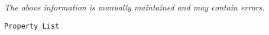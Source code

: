 \label{pkg:property\_list}

{\tiny \it The above information is manually maintained and may contain errors.}
\begin{verbatim}
Property_List
\end{verbatim}
